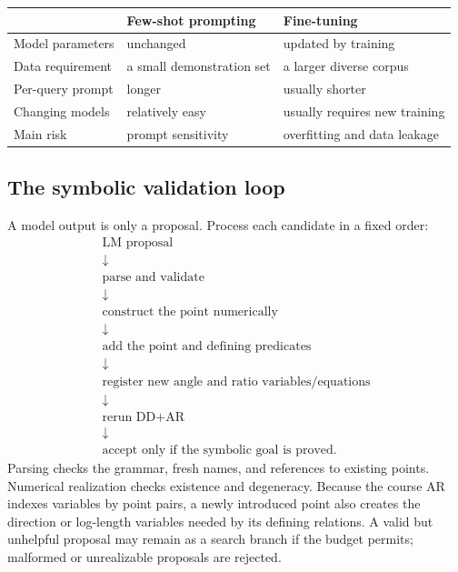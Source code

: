 \documentclass[reqno]{amsart}
\DeclareMathOperator{\1}{\textbf{1}}
\begin{document}
\begin{center}
\begin{tabular}{p{}p{}p{}}
 & \textbf{Few-shot prompting} & \textbf{Fine-tuning} \\
\hline
Model parameters & unchanged & updated by training \\
Data requirement & a small demonstration set & a larger diverse corpus \\
Per-query prompt & longer & usually shorter \\
Changing models & relatively easy & usually requires new training \\
Main risk & prompt sensitivity & overfitting and data leakage \\
\end{tabular}
\end{center}

\subsection{The symbolic validation loop}
\label{sec: Integrating the language model}

A model output is only a proposal. Process each candidate in a fixed order:
\[
\begin{array}{c}
\text{LM proposal}\\ \downarrow\\
\text{parse and validate}\\ \downarrow\\
\text{construct the point numerically}\\ \downarrow\\
\text{add the point and defining predicates}\\ \downarrow\\
\text{register new angle and ratio variables/equations}\\ \downarrow\\
\text{rerun DD+AR}\\ \downarrow\\
\text{accept only if the symbolic goal is proved}.
\end{array}
\]
Parsing checks the grammar, fresh names, and references to existing points.
Numerical realization checks existence and degeneracy. Because the course AR
indexes variables by point pairs, a newly introduced point also creates the
direction or log-length variables needed by its defining relations. A valid
but unhelpful proposal may remain as a search branch if the budget permits;
malformed or unrealizable proposals are rejected.
\end{document}
